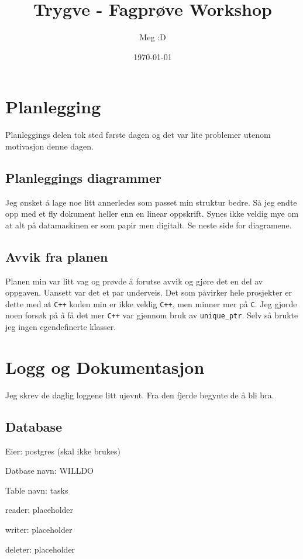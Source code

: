 \documentclass{article}
\title{Trygve - Fagprøve Workshop}
\author{Meg :D}
\date{\today}
\begin{document}
\maketitle
\tableofcontents
\newpage
\clearpage

\section{Planlegging}
Planleggings delen tok sted første dagen og det var lite problemer utenom motivasjon denne dagen.
\subsection{Planleggings diagrammer}
Jeg ønsket å lage noe litt annerledes som passet min struktur bedre. Så jeg endte opp med et fly dokument heller enn en linear oppskrift. Synes ikke veldig mye om at alt på datamaskinen er som papir men digitalt. Se neste side for diagramene.


\subsection{Avvik fra planen}
Planen min var litt vag og prøvde å forutse avvik og gjøre det en del av oppgaven. Uansett var det et par underveis. Det som påvirker hele prosjekter er dette med at \lstinline!C++! koden min er ikke veldig \lstinline!C++!, men minner mer på \lstinline!C!. Jeg gjorde noen forsøk på å få det mer \lstinline!C++! var gjennom bruk av \lstinline!unique_ptr!. Selv så brukte jeg ingen egendefinerte klasser.

\section{Logg og Dokumentasjon}
Jeg skrev de daglig loggene litt ujevnt. Fra den fjerde begynte de å bli bra.
\subsection{Database}
Eier: postgres (skal ikke brukes)

Datbase navn:
WILLDO

Table navn:
tasks

reader:
placeholder

writer:
placeholder

deleter:
placeholder
\end{document}
